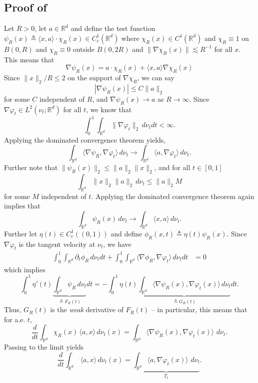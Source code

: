 \documentclass[11pt]{article}
\begin{document}
\subsection{Proof of } \label{sec: proof of pt recovers parallel trends}
Let $R> 0$, let $a \in \mathbb{R}^d$ and define the test function $\psi_R(x) \triangleq \langle x, a \rangle \cdot \chi_R(x) \in C^1_c(\mathbb{R}^d)$ where $\chi_R(x) \in C^1(\mathbb{R}^d)$ and $\chi_R \equiv 1$ on $B(0,R)$ and $\chi_R \equiv 0$ outside $B(0, 2R)$ and $\|\nabla\chi_R(x)\|\lesssim R^{-1}$ for all $x$. This means that
\[\nabla \psi_R(x) = a\cdot\chi_R(x) + \langle x, a \rangle \nabla \chi_R(x)\]
Since $\|x\|_2/R \leq 2$ on the support of $\nabla \chi_R$, we can say
\[|\nabla \psi_R(x)| \le C\|a\|_2\]
for some $C$ independent of $R$, and $\nabla \psi_R(x) \rightarrow a$ as $R \rightarrow \infty$. Since $\nabla \varphi_t \in L^2(\nu_t; \mathbb{R}^d)$ for all $t$, we know that 
\[\int_0^1\int_{\mathbb{R}^d}\|\nabla \varphi_t\|_2 \, d\nu_t dt  < \infty.\]
Applying the dominated convergence theorem yields,
\[\int_{\mathbb{R}^d} \langle \nabla \psi_R, \nabla\varphi_t\rangle \, d\nu_t \rightarrow \int_{\mathbb{R}^d}\langle a, \nabla\varphi_t\rangle\, d\nu_t.\]
Further note that $\|\psi_R(x)\|_2\leq\|a\|_2\|x\|_2$, and for all $t \in [0, 1]$
\[\int_{\mathbb{R}^d}\|x\|_2\|a\|_2 \, d\nu_t \leq \|a\|_2M\]
for some $M$ independent of $t$. Applying the dominated convergence theorem again implies that
\[\int_{\mathbb{R}^d}\psi_R(x)\, d\nu_t \rightarrow \int_{\mathbb{R}^d}\langle x, a\rangle \, d\nu_t.\]
Further let $\eta(t) \in C_c^1((0, 1))$ and define $\phi_R(x, t) \triangleq \eta(t)\psi_R(x)$. Since $\nabla\varphi_t$ is the tangent velocity at $\nu_t$, we have
\begin{align*}
    \int_0^1 \int_{\mathbb{R}^d}\partial_t\phi_R \, d\nu_t dt + \int_0^1\int_{\mathbb{R}^d} \langle\nabla \phi_R, \nabla \varphi_t\rangle \,d\nu_tdt &= 0
\end{align*}
which implies 
\[\int_0^1\eta'(t)\underbrace{\int_{\mathbb{R}^d}\psi_R \, d\nu_t}_{\triangleq F_R(t)}dt  = -\int_0^1\eta(t)\underbrace{\int_{\mathbb{R}^d} \langle \nabla \psi_R(x), \nabla \varphi_t(x)\rangle \, d\nu_t}_{\triangleq G_R(t)}dt.\]
Thus, $G_R(t)$ is the \textit{weak} derivative of $F_R(t)$ -- in particular, this means that for a.e. $t$,
\[\frac{d}{dt} \int_{\mathbb{R}^d} \chi_R(x)\,\langle a, x\rangle \, d\nu_t(x) = \int_{\mathbb{R}^d} \langle \nabla \psi_R(x), \nabla \varphi_t(x)\rangle \, \, d\nu_t.\]
Passing to the limit yields
\[\frac{d}{dt} \int_{\mathbb{R}^d}\,\langle a, x\rangle \, d\nu_t(x) = \underbrace{\int_{\mathbb{R}^d} \langle a, \nabla \varphi_t(x)\rangle \, \, d\nu_t}_{T_{t}}.\]
\end{document}
